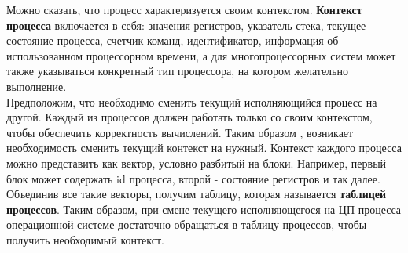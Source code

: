 Можно сказать, что процесс характеризуется своим контекстом. \textbf{Контекст процесса} включается в себя: значения регистров, указатель стека, текущее состояние процесса, счетчик команд, идентификатор, информация об использованном процессорном времени, а для многопроцессорных систем может также указываться конкретный тип процессора, на котором желательно выполнение.\\
Предположим, что необходимо сменить текущий исполняющийся процесс на другой. Каждый из процессов должен работать только со своим контекстом, чтобы обеспечить корректность вычислений. Таким образом , возникает необходимость сменить текущий контекст на нужный. Контекст каждого процесса можно представить как вектор, условно разбитый на блоки. Например, первый блок может содержать id процесса, второй - состояние регистров и так далее. Объединив все такие векторы, получим таблицу, которая называется \textbf{таблицей процессов}. Таким образом, при смене текущего исполняющегося на ЦП процесса операционной системе достаточно обращаться в таблицу процессов, чтобы получить необходимый контекст.